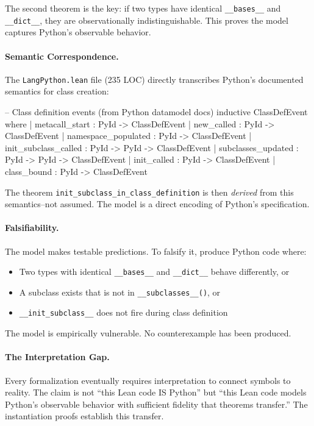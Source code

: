 The second theorem is the key: if two types have identical \texttt{\_\_bases\_\_} and \texttt{\_\_dict\_\_}, they are observationally indistinguishable. This proves the model captures Python's observable behavior.

\paragraph{Semantic Correspondence.} The \texttt{LangPython.lean} file (235 LOC) directly transcribes Python's documented semantics for class creation:

\begin{code}
-- Class definition events (from Python datamodel docs)
inductive ClassDefEvent where
  | metacall_start : PyId -> ClassDefEvent
  | new_called : PyId -> ClassDefEvent
  | namespace_populated : PyId -> ClassDefEvent
  | init_subclass_called : PyId -> PyId -> ClassDefEvent
  | subclasses_updated : PyId -> PyId -> ClassDefEvent
  | init_called : PyId -> ClassDefEvent
  | class_bound : PyId -> ClassDefEvent
\end{code}

The theorem \texttt{init\_subclass\_in\_class\_definition} is then \emph{derived} from this semantics--not assumed. The model is a direct encoding of Python's specification.

\paragraph{Falsifiability.} The model makes testable predictions. To falsify it, produce Python code where:
\begin{itemize}
\tightlist
\item Two types with identical \texttt{\_\_bases\_\_} and \texttt{\_\_dict\_\_} behave differently, or
\item A subclass exists that is not in \texttt{\_\_subclasses\_\_()}, or
\item \texttt{\_\_init\_subclass\_\_} does not fire during class definition
\end{itemize}

The model is empirically vulnerable. No counterexample has been produced.

\paragraph{The Interpretation Gap.} Every formalization eventually requires interpretation to connect symbols to reality. The claim is not ``this Lean code IS Python'' but ``this Lean code models Python's observable behavior with sufficient fidelity that theorems transfer.'' The instantiation proofs establish this transfer.

